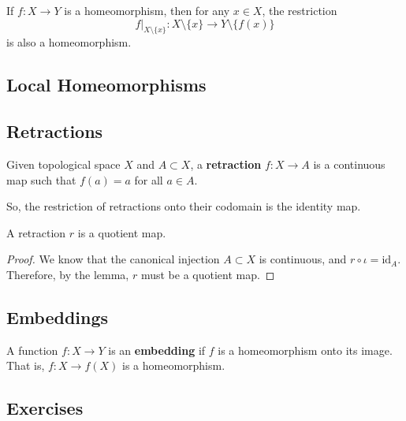   \begin{theorem}
    If $f: X \rightarrow Y$ is a homeomorphism, then for any $x \in X$, the restriction 
    \begin{equation}
      f|_{X \setminus \{x\}} : X \setminus \{x\} \rightarrow Y \setminus \{f(x)\}
    \end{equation}
    is also a homeomorphism. 
  \end{theorem}

\subsection{Local Homeomorphisms} 

\subsection{Retractions}

  \begin{definition}[Retraction]
		\label{def:retraction}
    Given topological space $X$ and $A \subset X$, a \textbf{retraction} $f: X \to A$ is a continuous map such that $f(a) = a$ for all $a \in A$. 
  \end{definition}

  So, the restriction of retractions onto their codomain is the identity map. 

  \begin{theorem}
    A retraction $r$ is a quotient map. 
  \end{theorem}
  \begin{proof}
    We know that the canonical injection $A \subset X$ is continuous, and $r \circ \iota = \mathrm{id}_A$. Therefore, by the lemma, $r$ must be a quotient map. 
  \end{proof}

\subsection{Embeddings} 

	\begin{definition}[Embedding]
	  A function $f: X \to Y$ is an \textbf{embedding} if $f$ is a homeomorphism onto its image. That is, $f: X \to f(X)$ is a homeomorphism. 
	\end{definition}

\subsection{Exercises}

